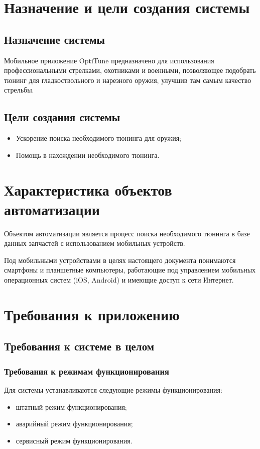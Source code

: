 \documentclass[14pt]{extreport}
\begin{document}
\newpage
\section{Назначение и цели создания системы}
\subsection{Назначение системы}
Мобильное приложение OptiTune предназначено для использования профессиональными стрелками, охотниками и военными, позволяющее подобрать тюнинг для гладкоствольного и нарезного оружия, улучшив там самым качество стрельбы.

\subsection{Цели создания системы}

\begin{itemize}
	\item Ускорение поиска необходимого тюнинга для оружия;	
	\item Помощь в нахождении необходимого тюнинга.
\end{itemize}

\newpage
\section{Характеристика объектов автоматизации}

Объектом автоматизации является процесс поиска необходимого тюнинга в базе данных запчастей с использованием мобильных устройств.

Под мобильными устройствами в целях настоящего документа понимаются смартфоны и планшетные компьютеры, работающие под управлением мобильных операционных систем (iOS, Android) и имеющие доступ к сети Интернет.

\newpage
\section{Требования к приложению}
\subsection{Требования к системе в целом}
\subsubsection{Требования к режимам функционирования}
Для системы устанавливаются следующие режимы функционирования:
\begin{itemize}
	\item штатный режим функционирования;
	\item аварийный режим функционирования;
	\item сервисный режим функционирования.
\end{itemize}
\end{document}
